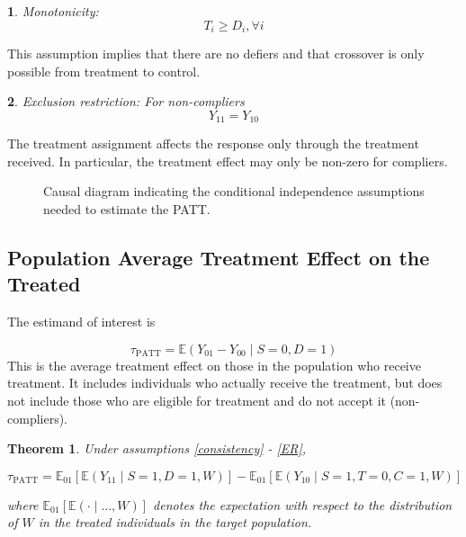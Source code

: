 \documentclass[12pt]{article}
\makeatletter
\newtheorem{theorem}{Theorem}
\newtheorem*{assumption*}{\assumptionnumber}
\providecommand{\assumptionnumber}{}
\newenvironment{assumption}[2]
 {%
  \renewcommand{\assumptionnumber}{Assumption #1}%
  \begin{assumption*}%
  \protected@edef\@currentlabel{#1}%
 }
 {%
  \end{assumption*}
 }
\newcommand{\ex}{\mathbb{E}} %
\makeatother
\begin{document}
\begin{assumption}{6}{}\label{monotonicity}
Monotonicity: 
\begin{equation*}
T_i \geq D_i, \forall i
\end{equation*}
\end{assumption}
\noindent This assumption implies that there are no defiers and that crossover is only possible from treatment to control.

\begin{assumption}{7}{}\label{ER}
Exclusion restriction: For non-compliers
\begin{equation*}
Y_{11} = Y_{10}
\end{equation*}  
\end{assumption}
\noindent The treatment assignment affects the response only through the treatment received.  In particular, the treatment effect may only be non-zero for compliers.  

\begin{figure}[h]
\centering
{}
\caption{Causal diagram indicating the conditional independence assumptions needed to estimate the PATT.}\label{fig:DAG}
\end{figure}

\subsection{Population Average Treatment Effect on the Treated}
The estimand of interest is 

\begin{equation}
\tau_{\text{PATT}} = \ex\left( Y_{01} - Y_{00} \mid S=0, D=1\right)
\end{equation}
This is the average treatment effect on those in the population who receive treatment.  It includes individuals who actually receive the treatment, but does not include those who are eligible for treatment and do not accept it (non-compliers).

\begin{theorem}\label{thm1}
Under assumptions \eqref{consistency} - \eqref{ER},

$$\tau_{\text{PATT}} = \ex_{01}\left[  \ex\left(Y_{11} \mid S=1, D=1, W\right)\right]
-\ex_{01}\left[  \ex\left(Y_{10} \mid S=1, T=0, C=1, W\right) \right] $$

where $\ex_{01}\left[\ex(\cdot \mid\dots, W)\right]$ denotes the expectation with respect to the distribution of $W$ in the treated individuals in the target population.  
\end{theorem}
\end{document}
